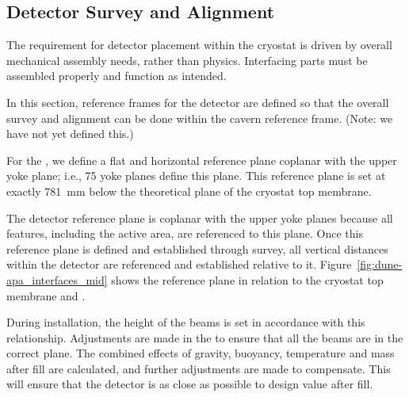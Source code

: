 \subsection{Detector Survey and Alignment}
\label{sec:fdsp-coord-integ-survey}
The requirement for detector placement within the cryostat is driven
by overall mechanical assembly needs, rather than physics.  %
Interfacing
parts %
must be assembled properly and function as intended.


In this section, reference frames for the detector are defined so that the
overall survey and alignment can be done within the cavern reference
frame. (Note: we have not yet defined this.) 


For the , we define a flat and horizontal %
reference plane %
coplanar with the upper  yoke plane; i.e., %
75 yoke planes define this %
plane. This
reference plane is set at exactly \SI{781}{mm} below the theoretical plane
of the cryostat top membrane.


The detector reference plane is coplanar with the upper 
yoke planes because all features, including the active area, are
referenced to this plane.   Once this reference plane is defined and
established through survey, all vertical distances within the detector
are referenced and established relative to it. %
Figure~\ref{fig:dune-apa_interfaces_mid} shows the reference plane in
relation to the cryostat top membrane and .


During installation, the height of the  beams is set in
accordance with this relationship. Adjustments are made in the
 to ensure that all the beams are in the correct plane. The
combined effects of gravity, buoyancy, temperature and  mass after
fill are calculated, and further adjustments are made to
compensate. This will ensure that the detector is as close as possible
to design value after fill. 


